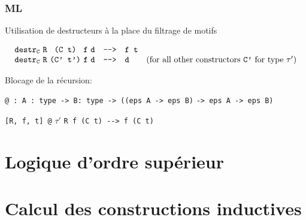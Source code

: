 \documentclass[12pt,aspectratio=169]{beamer}
\newcommand\lst[1]{{\lstinline{#1}}}
\begin{document}
\begin{frame}[fragile]
  \frametitle{ML}
  Utilisation de destructeurs à la place du filtrage de motifs

$$\begin{array}{c@{~}c@{~}c@{~}c@{~}ccll}
  \texttt{{destr}}_{\texttt{{C}}} & \texttt{{R}} & \texttt{{(C t)}}  & \texttt{{f}} & \texttt{{d}} & \texttt{{-{}->}} & \texttt{{f t}} & \\
  \texttt{{destr}}_{\texttt{{C}}} & \texttt{{R}} & \texttt{{(C' t')}}& \texttt{{f}} & \texttt{{d}} & \texttt{{-{}->}} & \texttt{{d}} &
  \text{(for all other constructors \texttt{C'} for type $\tau'$)} %
  \end{array}$$

  Blocage de la récursion:

    \lst{@ : A : type -> B: type -> ((eps A -> eps B)} \lst{-> eps A -> eps B)}

    \lst{[R, f, t] @} $\tau'$ \lst{R f (C t) --> f (C t)}

  
\end{frame}

\section{Logique d'ordre supérieur}


\section{Calcul des constructions inductives}
\end{document}
